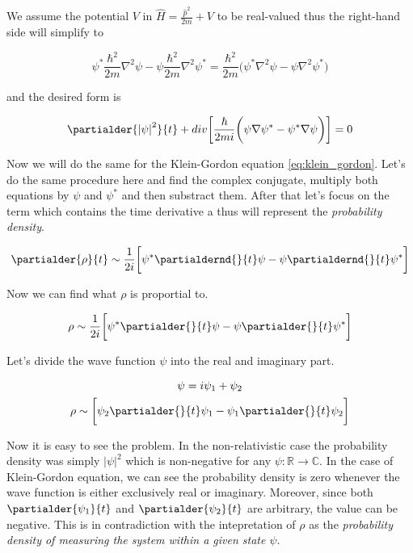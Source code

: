 We assume the potential $V$ in $\hat{H} = \frac{\hat{p}^{2}}{2m} + V$ to be real-valued thus the right-hand side
will simplify to

\begin{equation*}
    \psi^{*} \frac{\hbar^{2}}{2m} \nabla^{2} \psi - \psi \frac{\hbar^{2}}{2m} \nabla^{2} \psi^{*} 
    = \frac{\hbar^{2}}{2m} \bigg( \psi^{*} \nabla^{2} \psi - \psi \nabla^{2} \psi^{*} \bigg)
\end{equation*}

and the desired form is

\begin{equation*}
    \partialder{\left|\psi\right|^{2}}{t} + div \bigg[ \frac{\hbar}{2mi} \bigg( \psi \nabla \psi^{*} - \psi^{*} \nabla \psi \bigg) \bigg] = 0
\end{equation*}

Now we will do the same for the Klein-Gordon equation \ref{eq:klein_gordon}. Let's do the same procedure here and
find the complex conjugate, multiply both equations by $\psi$ and $\psi^{*}$ and then substract them. After that 
let's focus on the term which contains the time derivative a thus will represent the \textit{probability density}.

\begin{equation*}
    \partialder{\rho}{t} \sim \frac{1}{2i} \bigg[ \psi^{*} \partialdernd{}{t} \psi - \psi \partialdernd{}{t} \psi^{*} \bigg]
\end{equation*}

Now we can find what $\rho$ is proportial to. 

\begin{equation}
    \rho \sim \frac{1}{2i} \bigg[ \psi^{*} \partialder{}{t} \psi - \psi \partialder{}{t} \psi^{*} \bigg]
\end{equation}

Let's divide the wave function $\psi$ into the real and imaginary part.

\begin{equation*}
    \begin{gathered}
        \psi = i \psi_{1} + \psi_{2} \\
        \rho \sim \bigg[ \psi_{2} \partialder{}{t} \psi_{1} - \psi_{1} \partialder{}{t} \psi_{2} \bigg]
    \end{gathered}
\end{equation*}

Now it is easy to see the problem. In the non-relativistic case the probability density was simply $|\psi|^{2}$ which is
non-negative for any $\psi: \mathbb{R} \to \mathbb{C}$. In the case of Klein-Gordon equation, we can see the probability 
density is zero whenever the wave function is either exclusively real or imaginary. Moreover, since both 
$\partialder{\psi_{1}}{t}$ and $\partialder{\psi_{2}}{t}$ are arbitrary, the value can be negative. This is in contradiction
with the intepretation of $\rho$ as the \textit{probability density of measuring the system within a given state $\psi$}.


